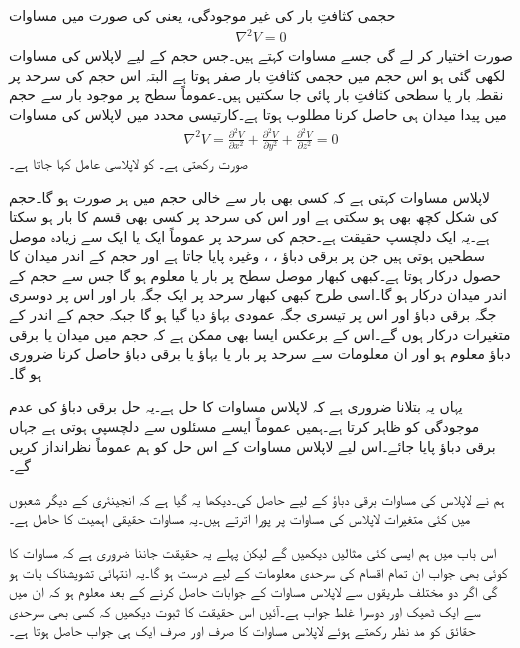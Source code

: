 حجمی کثافتِ بار کی غیر موجودگی، یعنی  کی صورت میں مساوات 
\begin{align}\label{مساوات_لاپلاس_لاپلاس_نقطہ_شکل}
\nabla^2 V=0
\end{align}
صورت اختیار کر لے گی جسے  مساوات کہتے ہیں۔جس حجم کے لیے لاپلاس کی مساوات لکھی گئی ہو اس حجم میں حجمی کثافتِ بار صفر ہوتا ہے البتہ اس حجم کی سرحد پر نقطہ بار یا سطحی کثافتِ بار پائی جا سکتیں ہیں۔عموماً سطح پر موجود بار سے حجم میں پیدا میدان ہی حاصل کرنا مطلوب ہوتا ہے۔کارتیسی محدد میں لاپلاس کی مساوات
\begin{align}\label{مساوات_لاپلاس_لاپلاس_کارتیسی_شکل}
\nabla^2 V=\frac{\partial^2 V}{\partial x^2}+\frac{\partial^2 V}{\partial y^2}+\frac{\partial^2 V}{\partial z^2}=0
\end{align}
صورت رکھتی ہے۔ کو لاپلاسی عامل کہا جاتا ہے۔

لاپلاس مساوات کہتی ہے کہ کسی بھی بار سے خالی حجم میں ہر صورت  ہو گا۔حجم کی شکل کچھ بھی ہو سکتی ہے اور اس کی سرحد پر کسی بھی قسم کا بار ہو سکتا ہے۔یہ ایک دلچسپ حقیقت ہے۔حجم کی سرحد پر عموماً ایک یا ایک سے زیادہ موصل سطحیں ہوتی ہیں جن پر برقی دباؤ ، ،  وغیرہ پایا جاتا ہے اور حجم کے اندر میدان کا حصول درکار ہوتا ہے۔کبھی کبھار موصل سطح پر بار یا  معلوم ہو گا جس سے حجم کے اندر میدان درکار ہو گا۔اسی طرح کبھی کبھار سرحد پر ایک جگہ بار اور اس پر دوسری جگہ برقی دباؤ اور اس پر تیسری  جگہ عمودی بہاؤ دیا گیا ہو گا جبکہ حجم کے اندر کے متغیرات درکار ہوں گے۔اس کے برعکس ایسا بھی ممکن ہے کہ حجم میں میدان یا برقی دباؤ معلوم ہو اور ان معلومات سے سرحد پر بار یا بہاؤ یا برقی دباؤ حاصل کرنا ضروری ہو گا۔

یہاں یہ بتلانا ضروری ہے کہ  لاپلاس مساوات کا حل ہے۔یہ حل برقی دباؤ کی عدم موجودگی کو ظاہر کرتا ہے۔ہمیں عموماً ایسے مسئلوں سے دلچسپی ہوتی ہے جہاں برقی دباؤ پایا جائے۔اس لیے  لاپلاس مساوات کے اس حل کو ہم عموماً نظرانداز کریں گے۔ 

ہم نے لاپلاس کی مساوات برقی دباؤ کے لیے حاصل کی۔دیکھا یہ گیا ہے کہ انجینئری کے دیگر شعبوں میں کئی متغیرات لاپلاس کی مساوات پر پورا اترتے ہیں۔یہ مساوات حقیقی اہمیت کا حامل ہے۔ 

اس باب میں ہم ایسی کئی مثالیں دیکھیں گے لیکن پہلے یہ حقیقت جاننا ضروری ہے کہ مساوات  کا کوئی بھی جواب ان تمام اقسام کی سرحدی معلومات کے لیے درست ہو گا۔یہ انتہائی تشویشناک بات ہو گی اگر دو مختلف طریقوں سے لاپلاس مساوات کے جوابات حاصل کرنے کے بعد معلوم ہو کہ ان میں سے ایک ٹھیک اور دوسرا غلط جواب ہے۔آئیں اس حقیقت کا ثبوت دیکھیں کہ کسی بھی سرحدی حقائق کو مد نظر رکھتے ہوئے لاپلاس مساوات کا صرف اور صرف ایک ہی جواب حاصل ہوتا ہے۔

